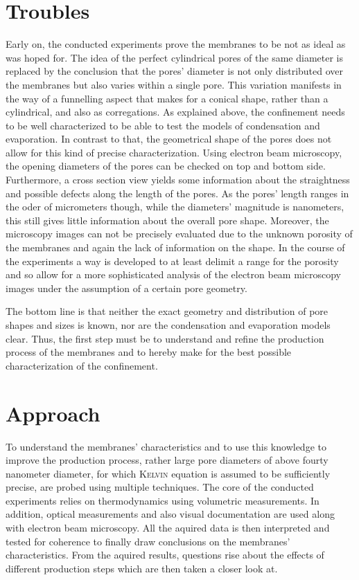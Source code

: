 \documentclass[../thesis.tex]{subfiles}
\begin{document}
    \section{Troubles}

      Early on, the conducted experiments prove the membranes to be not as ideal as was hoped for. The idea of the perfect cylindrical pores of the same diameter is replaced by the conclusion that the pores' diameter is not only distributed over the membranes but also varies within a single pore. This variation manifests in the way of a funnelling aspect that makes for a conical shape, rather than a cylindrical, and also as corregations. As explained above, the confinement needs to be well characterized to be able to test the models of condensation and evaporation. In contrast to that, the geometrical shape of the pores does not allow for this kind of precise characterization. Using electron beam microscopy, the opening diameters of the pores can be checked on top and bottom side. Furthermore, a cross section view yields some information about the straightness and possible defects along the length of the pores. As the pores' length ranges in the oder of micrometers though, while the diameters' magnitude is nanometers, this still gives little information about the overall pore shape. Moreover, the microscopy images can not be precisely evaluated due to the unknown porosity of the membranes and again the lack of information on the shape. In the course of the experiments a way is developed to at least delimit a range for the porosity and so allow for a more sophisticated analysis of the electron beam microscopy images under the assumption of a certain pore geometry.

      The bottom line is that neither the exact geometry and distribution of pore shapes and sizes is known, nor are the condensation and evaporation models clear. Thus, the first step must be to understand and refine the production process of the membranes and to hereby make for the best possible characterization of the confinement.


    \section{Approach}

      To understand the membranes' characteristics and to use this knowledge to improve the production process, rather large pore diameters of above fourty nanometer diameter, for which \textsc{Kelvin} equation is assumed to be sufficiently precise, are probed using multiple techniques. The core of the conducted experiments relies on thermodynamics using volumetric measurements. In addition, optical measurements and also visual documentation are used along with electron beam microscopy. All the aquired data is then interpreted and tested for coherence to finally draw conclusions on the membranes' characteristics. From the aquired results, questions rise about the effects of different production steps which are then taken a closer look at.
\end{document}
